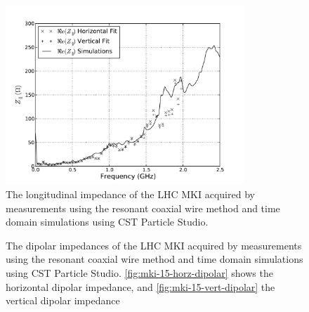 \begin{figure}
\begin{center}
\includegraphics[width=0.8\textwidth]{LHC_MKI/figures/mki_15_sims_meas_long.pdf}
\end{center}
\label{fig:mki-15-longitudinal}
\caption{The longitudinal impedance of the LHC MKI acquired by measurements using the resonant coaxial wire method and time domain simulations using CST Particle Studio.}
\end{figure}

\begin{figure}
\label{fig:mki-15-dipolar}
\caption{The dipolar impedances of the LHC MKI acquired by measurements using the resonant coaxial wire method and time domain simulations using CST Particle Studio. \ref{fig:mki-15-horz-dipolar} shows the horizontal dipolar impedance, and \ref{fig:mki-15-vert-dipolar} the vertical dipolar impedance}
\end{figure}

